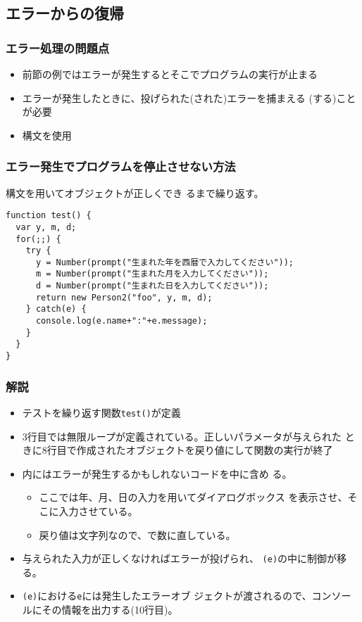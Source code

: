 \subsection{エラーからの復帰}
\begin{frame}[containsverbatim]
 \frametitle{エラー処理の問題点}
\begin{itemize}
 \item 前節の例ではエラーが発生するとそこでプログラムの実行が止まる
 \item エラーが発生したときに、投げられた(された)エラーを捕まえる
(する)ことが必要
 \item {}構文を使用
\end{itemize}
\end{frame}
\begin{frame}[containsverbatim]
 \frametitle{エラー発生でプログラムを停止させない方法}
構文を用いてオブジェクトが正しくでき
 るまで繰り返す。
\begin{Verbatim}
function test() {
  var y, m, d;
  for(;;) {
    try {
      y = Number(prompt("生まれた年を西暦で入力してください"));
      m = Number(prompt("生まれた月を入力してください"));
      d = Number(prompt("生まれた日を入力してください"));
      return new Person2("foo", y, m, d);
    } catch(e) {
      console.log(e.name+":"+e.message);
    }
  }
}
\end{Verbatim}
\end{frame}
\begin{frame}[containsverbatim]
 \frametitle{解説}
\begin{itemize}
 \item テストを繰り返す関数\texttt{test()}が定義
 \item 3行目では無限ループが定義されている。正しいパラメータが与えられた
			 ときに8行目で作成されたオブジェクトを戻り値にして関数の実行が終了
 \item {}内にはエラーが発生するかもしれないコードを中に含め
			 る。
	\begin{itemize}
	 \item ここでは年、月、日の入力を用いてダイアログボックス
				 を表示させ、そこに入力させている。
	 \item 戻り値は文字列なので、で数に直している。
	\end{itemize}
 \item 与えられた入力が正しくなければエラーが投げられ、
			 \texttt{(e)}の中に制御が移る。
 \item {}\texttt{(e)}における\texttt{e}には発生したエラーオブ
			 ジェクトが渡されるので、コンソールにその情報を出力する(10行目)。
\end{itemize}
\end{frame}
